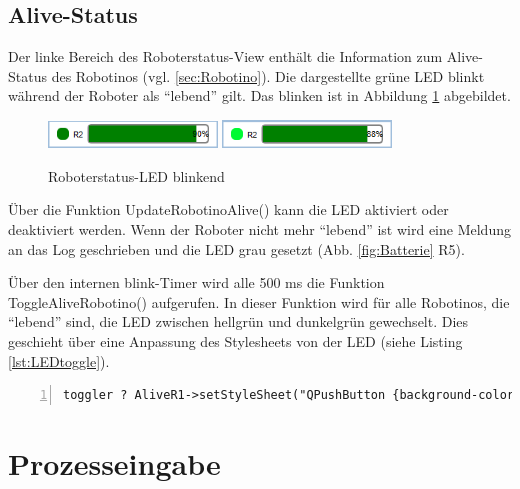 \subsection{Alive-Status}

Der linke Bereich des Roboterstatus-View enthält die Information zum Alive-Status des Robotinos (vgl. \ref{sec:Robotino}). Die dargestellte grüne LED blinkt während der Roboter als "`lebend"' gilt. Das blinken ist in Abbildung \ref{fig:Led} abgebildet. 

\begin{figure}[htb]
    \centering
    \includegraphics[width=0.4\textwidth]{Abbildungen/BatterieAlive1.png}
    \includegraphics[width=0.4\textwidth]{Abbildungen/BatterieAlive2.png}
    \caption{Roboterstatus-LED blinkend}		
    \label{fig:Led}
\end{figure}

Über die Funktion UpdateRobotinoAlive() kann die LED aktiviert oder deaktiviert werden. Wenn der Roboter nicht mehr "`lebend"' ist wird eine Meldung an das Log geschrieben und die LED grau gesetzt (Abb. \ref{fig:Batterie} R5). 


Über den internen blink-Timer wird alle 500 ms die Funktion ToggleAliveRobotino() aufgerufen. In dieser Funktion wird für alle Robotinos, die "`lebend"' sind, die LED zwischen hellgrün und dunkelgrün gewechselt. Dies geschieht über eine Anpassung des Stylesheets von der LED (siehe Listing \ref{lst:LEDtoggle}). 

\begin{lstlisting}[frame=single, breaklines=true, numbers=left, stepnumber=2, firstnumber=1, numberstyle = \tiny, caption=Stylesheet Aktualisierung der Alive-LED ,label=lst:LEDtoggle]
toggler ? AliveR1->setStyleSheet("QPushButton {background-color: rgb(0,250,50); border-radius: 6px;}") : AliveR1->setStyleSheet("QPushButton {background-color: green; border-radius: 6px;}");
\end{lstlisting}

\section{Prozesseingabe}
\label{sec:Prozesseingabe}

